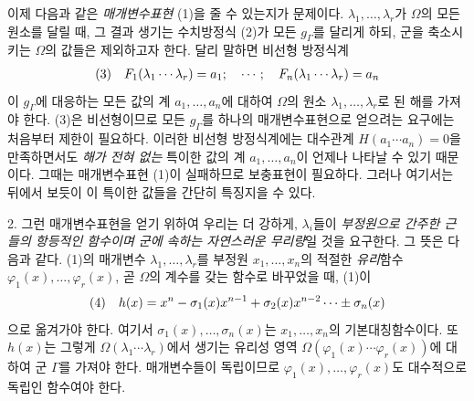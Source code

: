 이제 다음과 같은 \emph{매개변수표현} (1)을 줄 수 있는지가 문제이다. \(\lambda_1,\ldots,\lambda_r\)가 \(\Omega\)의 모든 원소를 달릴 때, 그 결과 생기는 수치방정식 (2)가 모든 \(g_\Gamma\)를 달리게 하되, 군을 축소시키는 \(\Omega\)의 값들은 제외하고자 한다. 달리 말하면 비선형 방정식계
\[
\begin{array}{@{}l@{\quad}l@{}}
(3)& \displaystyle F_1(\lambda_1\cdots\lambda_r)=a_1;\quad \cdots;\quad F_n(\lambda_1\cdots\lambda_r)=a_n
\end{array}
\]
이 \(g_\Gamma\)에 대응하는 모든 값의 계 \(a_1,\ldots,a_n\)에 대하여 \(\Omega\)의 원소 \(\lambda_1,\ldots,\lambda_r\)로 된 해를 가져야 한다. (3)은 비선형이므로 모든 \(g_\Gamma\)를 하나의 매개변수표현으로 얻으려는 요구에는 처음부터 제한이 필요하다. 이러한 비선형 방정식계에는 대수관계 \(H(a_1\cdots a_n)=0\)을 만족하면서도 \emph{해가 전혀 없는} 특이한 값의 계 \(a_1,\ldots,a_n\)이 언제나 나타날 수 있기 때문이다. 그때는 매개변수표현 (1)이 실패하므로 보충표현이 필요하다. 그러나 여기서는 뒤에서 보듯이 이 특이한 값들을 간단히 특징지을 수 있다.

2. 그런 매개변수표현을 얻기 위하여 우리는 더 강하게, \(\lambda_i\)들이 \emph{부정원으로 간주한 근들의 항등적인 함수이며 군에 속하는 자연스러운 무리량}일 것을 요구한다. 그 뜻은 다음과 같다. (1)의 매개변수 \(\lambda_1,\ldots,\lambda_r\)를 부정원 \(x_1,\ldots,x_n\)의 적절한 \emph{유리}함수 \(\varphi_1(x),\ldots,\varphi_r(x)\), 곧 \(\Omega\)의 계수를 갖는 함수로 바꾸었을 때, (1)이
\[
\begin{array}{@{}l@{\quad}l@{}}
(4)& \displaystyle h(x)=x^n-\sigma_1(x)x^{n-1}+\sigma_2(x)x^{n-2}\cdots\pm\sigma_n(x)
\end{array}
\]
으로 옮겨가야 한다. 여기서 \(\sigma_1(x),\ldots,\sigma_n(x)\)는 \(x_1,\ldots,x_n\)의 기본대칭함수이다. 또 \(h(x)\)는 그렇게 \(\Omega(\lambda_1\cdots\lambda_r)\)에서 생기는 유리성 영역 \(\Omega(\varphi_1(x)\cdots\varphi_r(x))\)에 대하여 군 \(\Gamma\)를 가져야 한다. 매개변수들이 독립이므로 \(\varphi_1(x),\ldots,\varphi_r(x)\)도 대수적으로 독립인 함수여야 한다.

